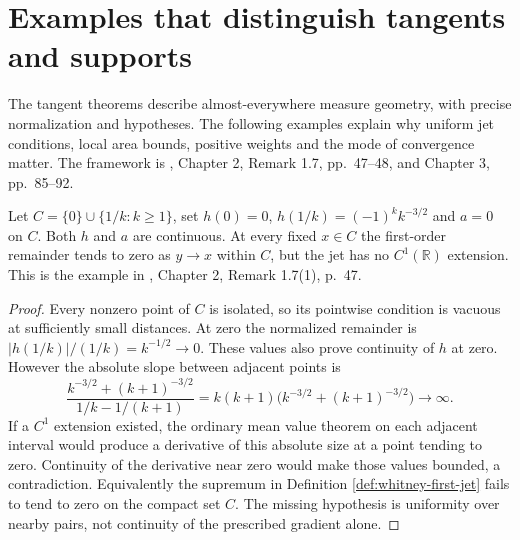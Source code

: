 \chapter{Examples that distinguish tangents and supports}\label{sec:examples-rectifiable-tangents}
The tangent theorems describe almost-everywhere measure geometry, with precise normalization and hypotheses. The following examples explain why uniform jet conditions, local area bounds, positive weights and the mode of convergence matter. The framework is \cite{Sim18}, Chapter 2, Remark 1.7, pp.~47--48, and Chapter 3, pp.~85--92.

\begin{example}\label{ex:whitney-nonuniform-jet}
Let $C=\{0\}\cup\{1/k:k\geq1\}$, set $h(0)=0$, $h(1/k)=(-1)^k k^{-3/2}$ and $a=0$ on $C$. Both $h$ and $a$ are continuous. At every fixed $x\in C$ the first-order remainder tends to zero as $y\to x$ within $C$, but the jet has no $C^1(\mathbb R)$ extension. This is the example in \cite{Sim18}, Chapter 2, Remark 1.7(1), p.~47.
\end{example}
\begin{proof}
Every nonzero point of $C$ is isolated, so its pointwise condition is vacuous at sufficiently small distances. At zero the normalized remainder is $|h(1/k)|/(1/k)=k^{-1/2}\to0$. These values also prove continuity of $h$ at zero. However the absolute slope between adjacent points is
\[
 \frac{k^{-3/2}+(k+1)^{-3/2}}{1/k-1/(k+1)}
 =k(k+1)\bigl(k^{-3/2}+(k+1)^{-3/2}\bigr)\longrightarrow\infty.
\]
If a $C^1$ extension existed, the ordinary mean value theorem on each adjacent interval would produce a derivative of this absolute size at a point tending to zero. Continuity of the derivative near zero would make those values bounded, a contradiction. Equivalently the supremum in Definition \ref{def:whitney-first-jet} fails to tend to zero on the compact set $C$. The missing hypothesis is uniformity over nearby pairs, not continuity of the prescribed gradient alone.
\end{proof}

